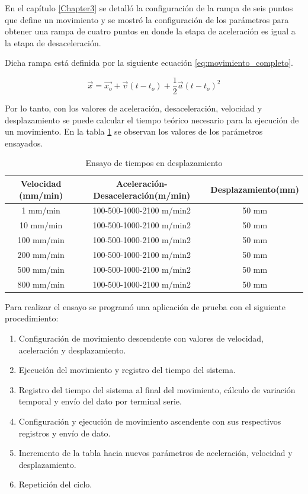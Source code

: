 En el capítulo \ref{Chapter3} se detalló la configuración de la rampa de seis puntos que define un movimiento y se mostró la configuración de los parámetros para obtener una rampa de cuatro puntos en donde la etapa de aceleración es igual a la etapa de desaceleración.

Dicha rampa está definida por la siguiente ecuación \ref{eq:movimiento_completo}.

\begin{equation}
	\label{eq:movimiento_completo}
	\vec{x}=\vec{x_o}+\vec{v}(t-t_o)+\frac12 \vec {a} (t-t_o)^2
\end{equation}

Por lo tanto, con los valores de aceleración, desaceleración, velocidad y desplazamiento se puede calcular el tiempo teórico necesario para la ejecución de un movimiento.
En la tabla \ref{tab:ensayo_comandos} se observan los valores de los parámetros ensayados.

\begin{table}[h]
	\centering
	\caption[Ensayo de tiempo en desplazamientos]{Ensayo de tiempos en desplazamiento}
	\begin{tabular}{c c c }    
		\toprule
		\textbf{Velocidad (mm/min)}     & \textbf{Aceleración-Desaceleración(m/min)} & \textbf{Desplazamiento(mm)} \\
		\midrule
		1  mm/min	 & 	   100-500-1000-2100 m/min2     & 	50 mm 			 	\\		
		10  mm/min   & 	   100-500-1000-2100 m/min2 	& 	50 mm				\\
		100  mm/min  & 	   100-500-1000-2100 m/min2	    & 	50 mm 				\\
		200  mm/min	 & 	   100-500-1000-2100 m/min2	    & 	50 mm 			\\
		500  mm/min	 & 	   100-500-1000-2100 m/min2     & 	50 mm					\\
		800  mm/min	 & 	   100-500-1000-2100 m/min2     & 	50 mm					\\
		\bottomrule
		\hline
	\end{tabular}
	\label{tab:ensayo_comandos}
\end{table}

Para realizar el ensayo se programó una aplicación de prueba con el siguiente procedimiento:

\begin{enumerate}
\item Configuración de movimiento descendente con valores de velocidad, aceleración y desplazamiento.
\item Ejecución del movimiento y registro del tiempo del sistema.
\item Registro del tiempo del sistema al final del movimiento, cálculo de variación temporal y envío del dato por terminal serie.
\item Configuración y ejecución de movimiento ascendente con sus respectivos registros y envío de dato.
\item Incremento de la tabla hacia nuevos parámetros de aceleración, velocidad y desplazamiento.
\item Repetición del ciclo.
\end{enumerate}

